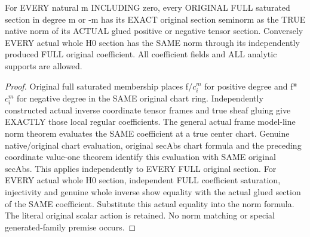 \begin{theorem}
\label{thm:seven-native-tensor-full-norms-arbitrary-field}
\leanok
For EVERY natural m INCLUDING zero, every ORIGINAL FULL saturated section
in degree m or -m has its EXACT original section seminorm as the TRUE
native norm of its ACTUAL glued positive or negative tensor section.
Conversely EVERY actual whole H0 section has the SAME norm through its
independently produced FULL original coefficient. All coefficient fields
and ALL analytic supports are allowed.
\end{theorem}
\begin{proof}
Original full saturated membership places f/$c_i^m$ for positive degree
and f*$c_i^m$ for negative degree in the SAME original chart ring.
Independently constructed actual inverse coordinate tensor frames and
true sheaf gluing give EXACTLY those local regular coefficients.
The general actual frame model-line norm theorem evaluates the SAME
coefficient at a true center chart. Genuine native/original chart
evaluation, original secAbs chart formula and the preceding coordinate
value-one theorem identify this evaluation with SAME original secAbs.
This applies independently to EVERY FULL original section. For EVERY
actual whole H0 section, independent FULL coefficient saturation,
injectivity and genuine whole inverse show equality with the actual
glued section of the SAME coefficient. Substitute this actual equality
into the norm formula. The literal original scalar action is retained.
No norm matching or special generated-family premise occurs.
\end{proof}

